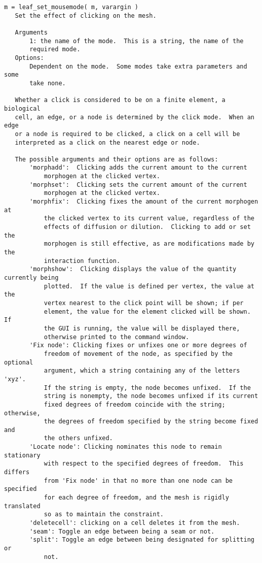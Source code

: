 \begin{verbatim}
m = leaf_set_mousemode( m, varargin )
   Set the effect of clicking on the mesh.

   Arguments
       1: the name of the mode.  This is a string, the name of the
       required mode.
   Options:
       Dependent on the mode.  Some modes take extra parameters and some
       take none.

   Whether a click is considered to be on a finite element, a biological
   cell, an edge, or a node is determined by the click mode.  When an edge
   or a node is required to be clicked, a click on a cell will be
   interpreted as a click on the nearest edge or node.

   The possible arguments and their options are as follows:
       'morphadd':  Clicking adds the current amount to the current
           morphogen at the clicked vertex.
       'morphset':  Clicking sets the current amount of the current
           morphogen at the clicked vertex.
       'morphfix':  Clicking fixes the amount of the current morphogen at
           the clicked vertex to its current value, regardless of the
           effects of diffusion or dilution.  Clicking to add or set the
           morphogen is still effective, as are modifications made by the
           interaction function.
       'morphshow':  Clicking displays the value of the quantity currently being
           plotted.  If the value is defined per vertex, the value at the
           vertex nearest to the click point will be shown; if per
           element, the value for the element clicked will be shown.  If
           the GUI is running, the value will be displayed there,
           otherwise printed to the command window.
       'Fix node': Clicking fixes or unfixes one or more degrees of
           freedom of movement of the node, as specified by the optional
           argument, which a string containing any of the letters 'xyz'.
           If the string is empty, the node becomes unfixed.  If the
           string is nonempty, the node becomes unfixed if its current
           fixed degrees of freedom coincide with the string; otherwise,
           the degrees of freedom specified by the string become fixed and
           the others unfixed.
       'Locate node': Clicking nominates this node to remain stationary
           with respect to the specified degrees of freedom.  This differs
           from 'Fix node' in that no more than one node can be specified
           for each degree of freedom, and the mesh is rigidly translated
           so as to maintain the constraint.
       'deletecell': clicking on a cell deletes it from the mesh.
       'seam': Toggle an edge between being a seam or not.
       'split': Toggle an edge between being designated for splitting or
           not.

\end{verbatim}

